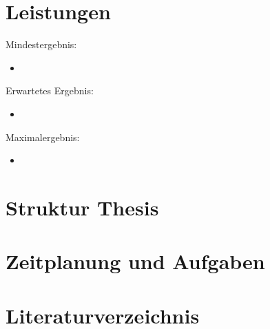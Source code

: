 \documentclass[12pt]{article}
\begin{document}
\section{Leistungen}
Mindestergebnis:
\begin{itemize}  
\item 
\end{itemize}
Erwartetes Ergebnis:
\begin{itemize}  
\item 
\end{itemize}
Maximalergebnis:
\begin{itemize}  
\item 
\end{itemize}

\newpage{}


\begin{appendix}
\section{Struktur Thesis}

\section{Zeitplanung und Aufgaben}

\end{appendix}
  
\newpage{}
\section{Literaturverzeichnis}

\newpage{}
\end{document}
